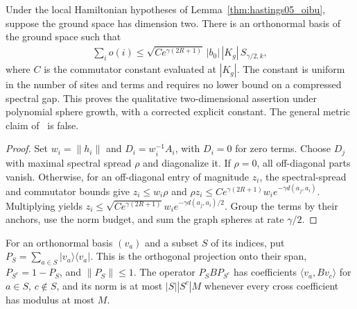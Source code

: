 \begin{lemma}
    \label{thm:hastings05_two_dim_uniform_sum}
    \leanok
    Under the local Hamiltonian hypotheses of Lemma~\ref{thm:hastings05_oibu},
    suppose the ground space has dimension two. There is an orthonormal basis
    of the ground space such that
    \begin{align*}
        \sum_i o(i)\le
        \sqrt{Ce^{\gamma(2R+1)}}\,|b_0|\,|K_g|\,S_{\gamma/2,k},
    \end{align*}
    where $C$ is the commutator constant evaluated at $|K_g|$.
    The constant is uniform in the number of sites and terms and requires no
    lower bound on a compressed spectral gap. This proves the qualitative
    two-dimensional assertion under polynomial sphere growth, with a corrected
    explicit constant\cite{gap:hastings05_two_dim_ground_basis}.
    The general metric claim of~\cite[lines 1678--1694]{Hastings2006Solving}
    is false\cite{gap:hastings05_tree_basis_counterexample}.
\end{lemma}
\begin{proof}\leanok
    Set $w_i=\|h_i\|$ and $D_i=w_i^{-1}A_i$, with $D_i=0$ for zero terms.
    Choose $D_j$ with maximal spectral spread $\rho$ and diagonalize it.
    If $\rho=0$, all off-diagonal parts vanish. Otherwise, for an off-diagonal
    entry of magnitude $z_i$, the spectral-spread and commutator bounds give
    $z_i\le w_i\rho$ and
    $\rho z_i\le Ce^{\gamma(2R+1)}w_i e^{-\gamma d(a_j,a_i)}$.
    Multiplying yields
    $z_i\le\sqrt{Ce^{\gamma(2R+1)}}w_i e^{-\gamma d(a_j,a_i)/2}$.
    Group the terms by their anchors, use the norm budget, and sum the graph
    spheres at rate $\gamma/2$.
\end{proof}

\begin{definition}
    \label{def:hastings05_basis_split_projection}
    \leanok
    For an orthonormal basis $(v_a)$ and a subset $S$ of its indices, put
    $P_S=\sum_{a\in S}|v_a\rangle\langle v_a|$. This is the orthogonal
    projection onto their span, $P_{S^c}=1-P_S$, and $\|P_S\|\le1$.
    The operator $P_SBP_{S^c}$ has coefficients
    $\langle v_a,Bv_c\rangle$ for $a\in S$, $c\notin S$, and its norm is
    at most $|S||S^c|M$ whenever every cross coefficient has modulus at most $M$.
\end{definition}

